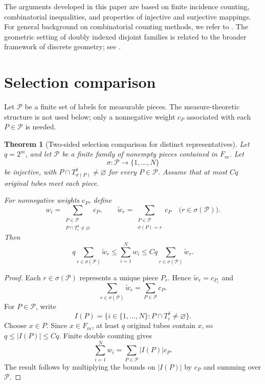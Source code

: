 \documentclass[11pt, letterpaper]{nyjm}
\newtheorem{theorem}{Theorem}[section]
\newcommand{\calP}{\mathcal{P}}
\begin{document}
	The arguments developed in this paper are based on
	finite incidence counting, combinatorial inequalities,
	and properties of injective and surjective mappings.
	For general background on combinatorial counting
	methods, we refer to \cite{vanLintWilson}.
	The geometric setting of doubly indexed disjoint
	families is related to the broader framework of
	discrete geometry; see \cite{Matousek}.
	
	\section{Selection comparison}
	
	Let $\calP$ be a finite set of labels for measurable pieces. The
	measure-theoretic structure is not used below; only a nonnegative weight
	$c_P$ associated with each $P\in\calP$ is needed.
	
	
   \begin{theorem}[Two-sided selection comparison for distinct representatives]
   	\label{thm:selection-comparison-sigma}
   	Let $q=2^m$, and let $\mathcal P$ be a finite family of nonempty
   	pieces contained in $F_m$. Let
   	\[
   	\sigma:\mathcal P\longrightarrow\{1,\ldots,N\}
   	\]
   	be injective, with $P\cap T_{\sigma(P)}^\delta\ne\varnothing$
   	for every $P\in\mathcal P$. Assume that at most $Cq$ original tubes
   	meet each piece.
   	
   	For nonnegative weights $c_P$, define
   	\[
   	w_i
   	=\sum_{\substack{P\in\mathcal P\\
   			P\cap T_i^\delta\ne\varnothing}}c_P,
   	\qquad
   	\widetilde w_r
   	=\sum_{\substack{P\in\mathcal P\\ \sigma(P)=r}}c_P
   	\quad\bigl(r\in\sigma(\mathcal P)\bigr).
   	\]
   	Then
   	\begin{equation}
   		\label{eq:selection-comparison-sigma}
   		q\sum_{r\in\sigma(\mathcal P)}\widetilde w_r
   		\le \sum_{i=1}^{N}w_i
   		\le Cq\sum_{r\in\sigma(\mathcal P)}\widetilde w_r.
   	\end{equation}
   \end{theorem}
   
   \begin{proof}
   	Each $r\in\sigma(\mathcal P)$ represents a unique piece $P_r$.
   	Hence $\widetilde w_r=c_{P_r}$ and
   	\[
   	\sum_{r\in\sigma(\mathcal P)}\widetilde w_r
   	=\sum_{P\in\mathcal P}c_P.
   	\]
   	For $P\in\mathcal P$, write
   	\[
   	I(P)=\{i\in\{1,\ldots,N\}:P\cap T_i^\delta\ne\varnothing\}.
   	\]
   	Choose $x\in P$. Since $x\in F_m$, at least $q$ original tubes
   	contain $x$, so $q\le |I(P)|\le Cq$. Finite double counting gives
   	\[
   	\sum_{i=1}^{N}w_i=\sum_{P\in\mathcal P}|I(P)|c_P.
   	\]
   	The result follows by multiplying the bounds on $|I(P)|$ by $c_P$
   	and summing over $\mathcal P$.
   \end{proof}
\end{document}
